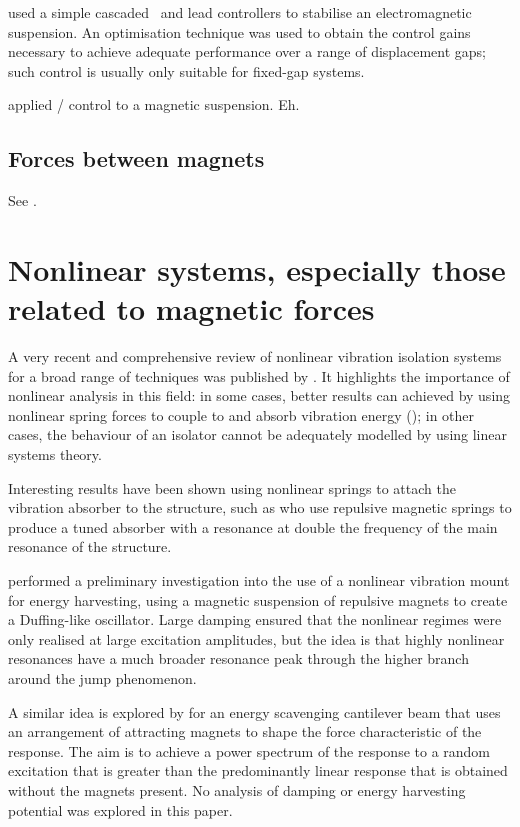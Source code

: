 \textcite{banerjee2008} used a simple cascaded \PI\ and lead controllers to stabilise an electromagnetic suspension.
An optimisation technique was used to obtain the control gains necessary to achieve adequate performance over a range of displacement gaps; such control is usually only suitable for fixed-gap systems.

\textcite{gosiewski2008} applied \Hinf/ control to a magnetic suspension.
Eh.


\subsection{Forces between magnets}

See .



\section{Nonlinear systems, especially those related to magnetic forces}

A very recent and comprehensive review of nonlinear vibration isolation systems for a broad range of techniques was published by \textcite{ibrahim2008}.
It highlights the importance of nonlinear analysis in this field: in some cases, better results can achieved by using nonlinear spring forces to couple to and absorb vibration energy (); in other cases, the behaviour of an isolator cannot be adequately modelled by using linear systems theory.

Interesting results have been shown using nonlinear springs to attach the vibration absorber to the structure, such as \textcite{jo2008} who use repulsive magnetic springs to produce a tuned absorber with a resonance at double the frequency of the main resonance of the structure.

\textcite{mann2008} performed a preliminary investigation into the use of a nonlinear vibration mount for energy harvesting, using a magnetic suspension of repulsive magnets to create a Duffing-like oscillator.
Large damping ensured that the nonlinear regimes were only realised at large excitation amplitudes, but the idea is that highly nonlinear resonances have a much broader resonance peak through the higher branch around the jump phenomenon. 

A similar idea is explored by \textcite{shahruz2008} for an energy scavenging cantilever beam that uses an arrangement of attracting magnets to shape the force characteristic of the response.
The aim is to achieve a power spectrum of the response to a random excitation that is greater than the predominantly linear response that is obtained without the magnets present.
No analysis of damping or energy harvesting potential was explored in this paper.

